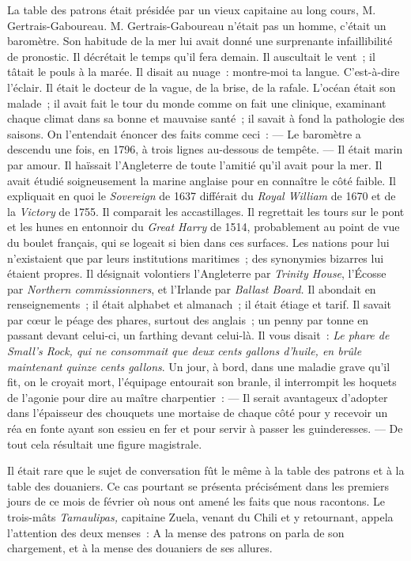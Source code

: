 \documentclass[french,twoside]{book} %
\begin{document}
La table des patrons était présidée par un vieux capitaine au long cours, M. Gertrais-Gaboureau. M. Gertrais-Gaboureau n’était pas un homme, c’était un baromètre. Son habitude de la mer lui avait donné une surprenante infaillibilité de pronostic. Il décrétait le temps qu’il fera demain. Il auscultait le vent ; il tâtait le pouls à la marée. Il disait au nuage : montre-moi ta langue. C’est-à-dire l’éclair. Il était le docteur de la vague, de la brise, de la rafale. L’océan était son malade ; il avait fait le tour du monde comme on fait une clinique, examinant chaque climat dans sa bonne et mauvaise santé ; il savait à fond la pathologie des saisons. On l’entendait énoncer des faits comme ceci : — Le baromètre a descendu une fois, en 1796, à trois lignes au-dessous de tempête. — Il était marin par amour. Il haïssait l’Angleterre de toute l’amitié qu’il avait pour la mer. Il avait étudié soigneusement la marine anglaise pour en connaître le côté faible. Il expliquait en quoi le \emph{Sovereign} de 1637 différait du \emph{Royal William} de 1670 et de la \emph{Victory} de 1755. Il comparait les accastillages. Il regrettait les tours sur le pont et les hunes en entonnoir du \emph{Great Harry} de 1514, probablement au point de vue du boulet français, qui se logeait si bien dans ces surfaces. Les nations pour lui n’existaient que par leurs institutions  maritimes ; des synonymies bizarres lui étaient propres. Il désignait volontiers l’Angleterre par \emph{Trinity House}, l’Écosse par \emph{Northern commissionners}, et l’Irlande par \emph{Ballast Board.} Il abondait en renseignements ; il était alphabet et almanach ; il était étiage et tarif. Il savait par cœur le péage des phares, surtout des anglais ; un penny par tonne en passant devant celui-ci, un farthing devant celui-là. Il vous disait : \emph{Le phare de Small’s Rock, qui ne consommait que deux cents gallons d’huile, en brûle maintenant quinze cents gallons}. Un jour, à bord, dans une maladie grave qu’il fit, on le croyait mort, l’équipage entourait son branle, il interrompit les hoquets de l’agonie pour dire au maître charpentier : — Il serait avantageux d’adopter dans l’épaisseur des chouquets une mortaise de chaque côté pour y recevoir un réa en fonte ayant son essieu en fer et pour servir à passer les guinderesses. — De tout cela résultait une figure magistrale.\par
Il était rare que le sujet de conversation fût le même à la table des patrons et à la table des douaniers. Ce cas pourtant se présenta précisément dans les premiers jours de ce mois de février où nous ont amené les faits que nous racontons. Le trois-mâts \emph{Tamaulipas,} capitaine Zuela, venant du Chili et y retournant, appela l’attention des deux menses : A la mense des patrons on parla de son chargement, et à la mense des douaniers de ses allures.\par
\end{document}
